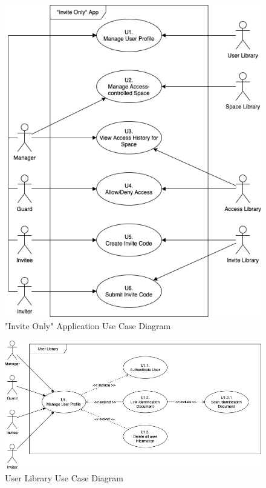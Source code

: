 \begin{figure}[H]
  \includegraphics[width=1.0\textwidth]{documentation/software_requirements_specification/subsystems/invite_only_use_case.png}
  \caption{"Invite Only" Application Use Case Diagram}
  \label{fig:invite_only_use_case}
\end{figure}

\begin{figure}[H]
  \includegraphics[width=1.0\textwidth]{documentation/software_requirements_specification/subsystems/user_library_use_case.png}
  \caption{User Library Use Case Diagram}
  \label{fig:user_library_use_case}
\end{figure}

